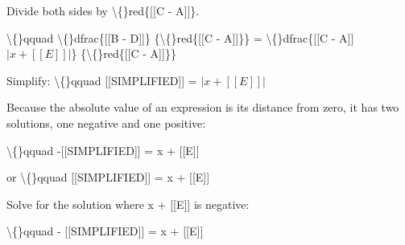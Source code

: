 \documentclass{article}
\begin{document}
\begin{itemize}
                        
                        
                            
                                Divide both sides by
                                \textbackslash\{\}red\{[[C - A]]\}.
                            
                            \textbackslash\{\}qquad
                                \textbackslash\{\}dfrac\{[[B - D]]\}
                                    \{\textbackslash\{\}red\{[[C - A]]\}\} =
                                \textbackslash\{\}dfrac\{[[C - A]]$| x + [[E]] |$\}
                                    \{\textbackslash\{\}red\{[[C - A]]\}\}
                            
                        
                        
                            Simplify:
                            \textbackslash\{\}qquad
                                [[SIMPLIFIED]] = $| x + [[E]] |$
                            
                        
                        
                            
                                
                                    Because the absolute value of an expression
                                    is its distance from zero, it has two
                                    solutions, one negative and one positive:
                                
                                \textbackslash\{\}qquad
                                    -[[SIMPLIFIED]] = x + [[E]]
                                
                                or
                                \textbackslash\{\}qquad
                                    [[SIMPLIFIED]] = x + [[E]]
                                
                            
                            
                                
                                    Solve for the solution where
                                    x + [[E]] is negative:
                                
                                
                                    \textbackslash\{\}qquad - [[SIMPLIFIED]] = x +
                                    [[E]]
                                
                            
                            

\end{itemize}
\end{document}
